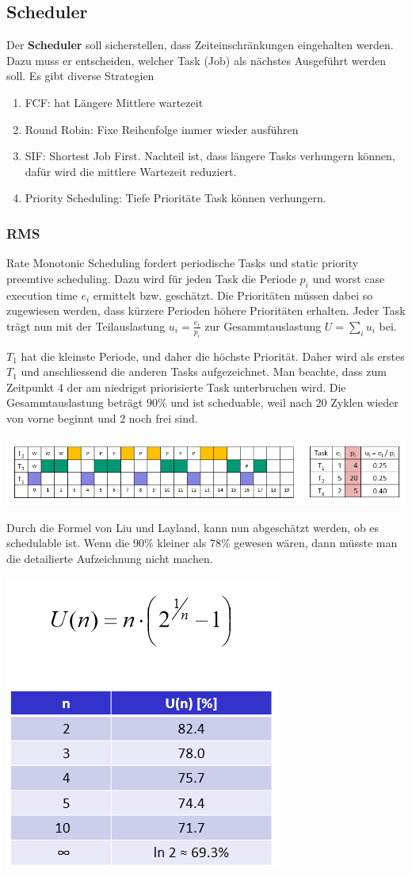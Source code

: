 \subsection{Scheduler}
Der \textbf{Scheduler} soll sicherstellen, dass Zeiteinschränkungen eingehalten werden. Dazu muss er entscheiden, welcher Task (Job) als nächstes Ausgeführt werden soll. Es gibt diverse Strategien
\begin{enumerate}
	\item FCF: hat Längere Mittlere wartezeit
	\item Round Robin: Fixe Reihenfolge immer wieder ausführen
	\item SIF: Shortest Job First. Nachteil ist, dass längere Tasks verhungern können, dafür wird die mittlere Wartezeit reduziert.
	\item Priority Scheduling: Tiefe Prioritäte Task können verhungern.
\end{enumerate}

\subsubsection{RMS}
Rate Monotonic Scheduling fordert periodische Tasks und static priority preemtive scheduling. Dazu wird für jeden Task die Periode $p_i$ und worst case execution time $e_i$ ermittelt bzw. geschätzt. Die Prioritäten müssen dabei so zugewiesen werden, dass kürzere Perioden höhere Prioritäten erhalten. Jeder Task trägt nun mit der Teilauslastung $u_i = \frac{e_i}{p_i}$ zur Gesammtauslastung $U = \sum_{i}^{}u_i$ bei.

$T_1$ hat die kleinste Periode, und daher die höchste Priorität. Daher wird als erstes $T_1$ und anschliessend die anderen Tasks aufgezeichnet. Man beachte, dass zum Zeitpunkt 4 der am niedrigst priorisierte Task unterbruchen wird. Die Gesammtauslastung beträgt $90\%$ und ist scheduable, weil nach 20 Zyklen wieder von vorne beginnt und 2 noch frei sind.
\begin{center}
	\includegraphics[width=\columnwidth]{Images/rms}
\end{center}

Durch die Formel von Liu und Layland, kann nun abgeschätzt werden, ob es schedulable ist. Wenn die 90\% kleiner als 78\% gewesen wären, dann müsste man die detailierte Aufzeichnung nicht machen.
\begin{center}
	\includegraphics[width=0.5\columnwidth]{Images/rms_def}
\end{center}
